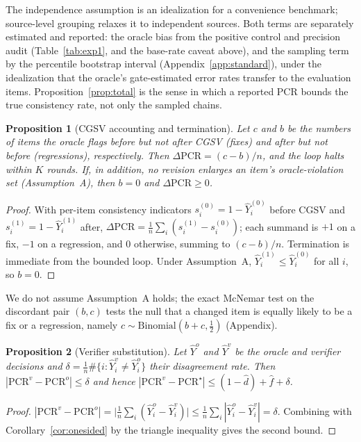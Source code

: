 \documentclass[pdflatex,sn-nature]{sn-jnl}
\newtheorem{proposition}{Proposition}
\begin{document}
\noindent The independence assumption is an idealization for a convenience benchmark;
source-level grouping relaxes it to independent sources. Both terms are separately
estimated and reported: the oracle bias from the positive control and precision audit
(Table~\ref{tab:exp1}, and the base-rate caveat above), and the sampling term by the
percentile bootstrap interval (Appendix~\ref{app:standard}), under the idealization that
the oracle's gate-estimated error rates transfer to the evaluation items.
Proposition~\ref{prop:total} is the sense in which a reported PCR bounds the true
consistency rate, not only the sampled chains.

\begin{proposition}[CGSV accounting and termination]\label{prop:cgsv}
Let $c$ and $b$ be the numbers of items the oracle flags before but not after CGSV
(fixes) and after but not before (regressions), respectively. Then
$\Delta\mathrm{PCR}=(c-b)/n$, and the loop halts within $K$ rounds. If, in addition,
no revision enlarges an item's oracle-violation set (Assumption~A), then $b=0$ and
$\Delta\mathrm{PCR}\ge0$.
\end{proposition}
\begin{proof}
With per-item consistency indicators $s_i^{(0)}=1-\hat Y_i^{(0)}$ before CGSV and
$s_i^{(1)}=1-\hat Y_i^{(1)}$ after, $\Delta\mathrm{PCR}=\frac1n\sum_i(s_i^{(1)}-s_i^{(0)})$;
each summand is $+1$ on a fix, $-1$ on a regression, and $0$ otherwise, summing to
$(c-b)/n$. Termination is immediate from the bounded loop. Under Assumption~A,
$\hat Y_i^{(1)}\le\hat Y_i^{(0)}$ for all $i$, so $b=0$.
\end{proof}

\noindent We do not assume Assumption~A holds; the exact McNemar test on the discordant
pair $(b,c)$ tests the null that a changed item is equally likely to be a fix or a
regression, namely $c\sim\mathrm{Binomial}(b+c,\tfrac12)$ (Appendix).

\begin{proposition}[Verifier substitution]\label{prop:verifier}
Let $\hat Y^o$ and $\hat Y^v$ be the oracle and verifier decisions and
$\delta=\frac1n\#\{i:\hat Y^v_i\neq\hat Y^o_i\}$ their disagreement rate. Then
$|\mathrm{PCR}^v-\mathrm{PCR}^o|\le\delta$ and hence
$|\mathrm{PCR}^v-\mathrm{PCR}^\star|\le(1-\hat d)+\hat f+\delta$.
\end{proposition}
\begin{proof}
$|\mathrm{PCR}^v-\mathrm{PCR}^o|=\big|\frac1n\sum_i(\hat Y^o_i-\hat Y^v_i)\big|
\le\frac1n\sum_i|\hat Y^o_i-\hat Y^v_i|=\delta$. Combining with
Corollary~\ref{cor:onesided} by the triangle inequality gives the second bound.
\end{proof}
\end{document}
